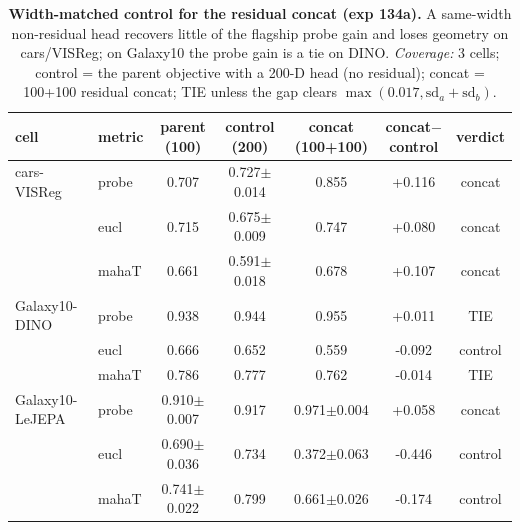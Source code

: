 \begin{table}[t]
\centering
\footnotesize
\begin{tabular}{llccccc}
\toprule
cell & metric & parent (100) & control (200) & concat (100+100) & concat$-$control & verdict \\
\midrule
cars-VISReg & probe & 0.707 & 0.727$\pm$0.014 & 0.855 & +0.116 & concat \\
 & eucl & 0.715 & 0.675$\pm$0.009 & 0.747 & +0.080 & concat \\
 & mahaT & 0.661 & 0.591$\pm$0.018 & 0.678 & +0.107 & concat \\
Galaxy10-DINO & probe & 0.938 & 0.944 & 0.955 & +0.011 & TIE \\
 & eucl & 0.666 & 0.652 & 0.559 & -0.092 & control \\
 & mahaT & 0.786 & 0.777 & 0.762 & -0.014 & TIE \\
Galaxy10-LeJEPA & probe & 0.910$\pm$0.007 & 0.917 & 0.971$\pm$0.004 & +0.058 & concat \\
 & eucl & 0.690$\pm$0.036 & 0.734 & 0.372$\pm$0.063 & -0.446 & control \\
 & mahaT & 0.741$\pm$0.022 & 0.799 & 0.661$\pm$0.026 & -0.174 & control \\
\bottomrule
\end{tabular}
\caption{\textbf{Width-matched control for the residual concat (exp 134a).} A same-width non-residual head recovers little of the flagship probe gain and loses geometry on cars/VISReg; on Galaxy10 the probe gain is a tie on DINO. \emph{Coverage:} 3 cells; control = the parent objective with a 200-D head (no residual); concat = 100+100 residual concat; TIE unless the gap clears $\max(0.017, \text{sd}_a+\text{sd}_b)$.}
\label{tab:app_width}
\end{table}
